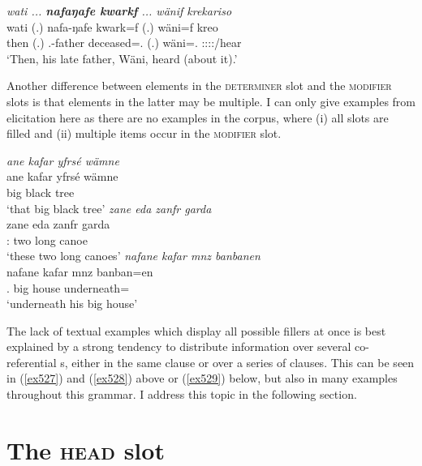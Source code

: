 \begin{exe}
	\ex \emph{wati ... \textbf{nafaŋafe kwarkf} ... wänif krekariso}\\
	\gll wati (.) nafa-ŋafe kwark=f (.) wäni=f kreo\\
	then (.) \Third.\Poss-father deceased=\Erg.\Sg{} (.) wäni=\Erg.\Sg{} \Sg:\Sbj:\Irr:\Pfv:\Andat/hear\\
	\trans `Then, his late father, Wäni, heard (about it).'
	\label{ex527}
\end{exe}

Another difference between elements in the \textsc{determiner} slot and the \textsc{modifier} slots is that elements in the latter may be multiple. I can only give examples from elicitation here as there are no examples in the corpus, where (i) all slots are filled and (ii) multiple items occur in the \textsc{modifier} slot.

\begin{exe}
	\ex \label{ex530}
	\begin{xlist}
		\ex \emph{ane kafar yfrsé wämne}\\
		\gll ane kafar yfrsé wämne\\
		\Dem{} big black tree\\
		\trans `that big black tree'
		\label{ex531}
		\ex \emph{zane eda zanfr garda}\\
		\gll zane eda zanfr garda\\
		\Dem:\Prox{} two long canoe\\
		\trans `these two long canoes'
		\label{ex532}
		\ex \emph{nafane kafar mnz banbanen}\\
		\gll nafane kafar mnz banban=en\\
		\Tsg.\Poss{} big house underneath=\Loc\\
		\trans `underneath his big house'
		\label{ex533}
	\end{xlist}
\end{exe}

The lack of textual examples which display all possible fillers at once is best explained by a strong tendency to distribute information over several co-referential s, either in the same clause or over a series of clauses. This can be seen in (\ref{ex527}) and (\ref{ex528}) above or (\ref{ex529}) below, but also in many examples throughout this grammar. I address this topic in the following section.

\section{The \textsc{head} slot}\label{headslot}

